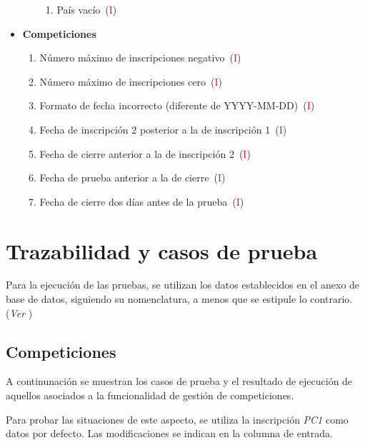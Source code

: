 \begin{itemize}
\begin{itemize}
\begin{enumerate}[label*=SVI\arabic*.]
					\item País vacío~(\textcolor{red}{I})
				\end{enumerate}
		\end{itemize}
	\item \textbf{Competiciones}
		 \begin{enumerate}[label=SC\arabic*.]
			\item Número máximo de inscripciones negativo~(\textcolor{red}{I})
			\item Número máximo de inscripciones cero~(\textcolor{red}{I})
			\item Formato de fecha incorrecto (diferente de YYYY-MM-DD)~(\textcolor{red}{I})
			\item Fecha de inscripción 2 posterior a la de inscripción 1~(\textcolor{red}{I})
			\item Fecha de cierre anterior a la de inscripción 2~(\textcolor{red}{I})
			\item Fecha de prueba anterior a la de cierre~(\textcolor{red}{I})
			\item Fecha de cierre dos días antes de la prueba~(\textcolor{red}{I})
		 \end{enumerate}
\end{itemize}

\section{Trazabilidad y casos de prueba}
Para la ejecución de las pruebas, se utilizan los datos establecidos en el anexo de base de datos,
siguiendo su nomenclatura, a menos que se estipule lo contrario. (\textit{Ver })
\subsection{Competiciones}
A continunación se muestran los casos de prueba y el resultado de ejecución de aquellos asociados
a la funcionalidad de gestión de competiciones.

Para probar las situaciones de este aspecto, se utiliza la inscripción \textit{PC1} como datos por
defecto. Las modificaciones se indican en la columna de entrada.

